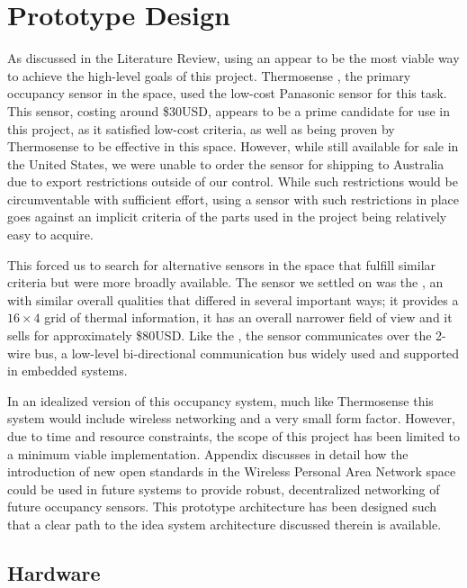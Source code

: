 \documentclass[../thesis/thesis.tex]{subfiles}
\begin{document}
 \chapter{Prototype Design}


As discussed in the Literature Review, using an \iar appear to be the most viable way to achieve the high-level goals of this project. Thermosense \cite{beltran2013thermosense}, the primary occupancy sensor in the \iar space, used the low-cost Panasonic \geye sensor for this task. This sensor, costing around \$30USD, appears to be a prime candidate for use in this project, as it satisfied low-cost criteria, as well as being proven by Thermosense to be effective in this space. However, while still available for sale in the United States, we were unable to order the sensor for shipping to Australia due to export restrictions outside of our control. While such restrictions would be circumventable with sufficient effort, using a sensor with such restrictions in place goes against an implicit criteria of the parts used in the project being relatively easy to acquire.

This forced us to search for alternative sensors in the space that fulfill similar criteria but were more broadly available. The sensor we settled on was the \mlx \cite{MLXDatasheet}, an \iar with similar overall qualities that differed in several important ways; it provides a $16 \times 4$ grid of thermal information, it has an overall narrower field of view and it sells for approximately \$80USD. Like the \geye, the \mlx sensor communicates over the 2-wire \iic bus, a low-level bi-directional communication bus widely used and supported in embedded systems.

In an idealized version of this occupancy system, much like Thermosense this system would include wireless networking and a very small form factor. However, due to time and resource constraints, the scope of this project has been limited to a minimum viable implementation. Appendix  discusses in detail how the introduction of new open standards in the Wireless Personal Area Network space could be used in future systems to provide robust, decentralized networking of future occupancy sensors. This prototype architecture has been designed such that a clear path to the idea system architecture discussed therein is available.


\section{Hardware}
\end{document}
